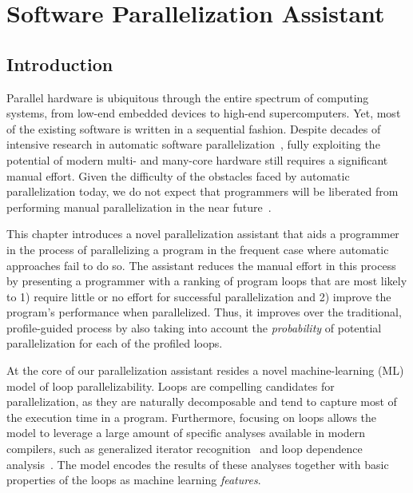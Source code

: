 \chapter{Software Parallelization Assistant}

\section{Introduction}


\quad Parallel hardware is ubiquitous through the entire spectrum of computing systems, from low-end embedded devices to high-end supercomputers.
%
Yet, most of the existing software is written in a sequential fashion.
%
Despite decades of intensive research in automatic software
parallelization~\cite{6813266}, fully exploiting the potential of modern multi- and many-core hardware still requires a significant manual effort.
%
Given the difficulty of the obstacles faced by automatic parallelization today, we do not expect that programmers will be liberated from performing manual parallelization in the near future~\cite{Larsen:2012:PML:2410141.2410600}.


This chapter introduces a novel parallelization assistant that aids a programmer in the process of parallelizing a program in the frequent case where automatic approaches fail to do so.
%
The assistant reduces the manual effort in this process by presenting a programmer with a ranking of program loops that are most likely to 1) require little or no effort for successful parallelization and 2) improve the program's performance when parallelized.
%
Thus, it improves over the traditional, profile-guided process by also taking into account the \emph{probability} of potential parallelization for each of the profiled loops.


At the core of our parallelization assistant resides a novel machine-learning (ML) model of loop parallelizability.
%
Loops are compelling candidates for parallelization, as they are naturally decomposable and tend to capture most of the execution time in a program.
%
Furthermore, focusing on loops allows the model to leverage a large amount of specific analyses available in modern compilers, such as generalized iterator recognition~\cite{Manilov:2018:GPI:3178372.3179511} and loop dependence analysis~\cite{Jensen:2017:ILD:3132652.3095754}.
%
The model encodes the results of these analyses together with basic properties of the loops as machine learning \textit{features}.

